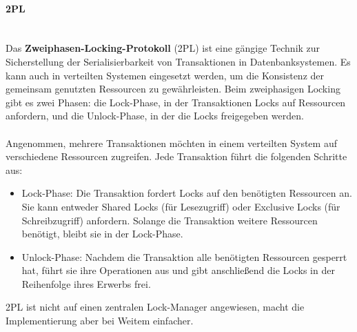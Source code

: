 \documentclass[../vs-script-first-v01.tex]{subfiles}
\begin{document}
\paragraph{2PL}\mbox{}\\
Das \textbf{Zweiphasen-Locking-Protokoll} (2PL) ist eine gängige Technik zur Sicherstellung der Serialisierbarkeit von Transaktionen in Datenbanksystemen. Es kann auch in verteilten Systemen eingesetzt werden, um die Konsistenz der gemeinsam genutzten Ressourcen zu gewährleisten. Beim zweiphasigen Locking gibt es zwei Phasen: die Lock-Phase, in der Transaktionen Locks auf Ressourcen anfordern, und die Unlock-Phase, in der die Locks freigegeben werden.
\\\\
Angenommen, mehrere Transaktionen möchten in einem verteilten System auf verschiedene Ressourcen zugreifen. Jede Transaktion führt die folgenden Schritte aus:
\begin{itemize}
\item Lock-Phase: Die Transaktion fordert Locks auf den benötigten Ressourcen an. Sie kann entweder Shared Locks (für Lesezugriff) oder Exclusive Locks (für Schreibzugriff) anfordern. Solange die Transaktion weitere Ressourcen benötigt, bleibt sie in der Lock-Phase.
\item Unlock-Phase: Nachdem die Transaktion alle benötigten Ressourcen gesperrt hat, führt sie ihre Operationen aus und gibt anschließend die Locks in der Reihenfolge ihres Erwerbs frei.
\end{itemize}
2PL ist nicht auf einen  zentralen Lock-Manager angewiesen, macht die Implementierung aber bei Weitem einfacher. 
\end{document}
